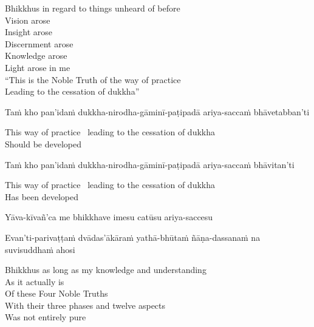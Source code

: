 \begin{english-verses}
  Bhikkhus in regard to things unheard of before\\
  Vision arose\\
  Insight arose\\
  Discernment arose\\
  Knowledge arose\\
  Light arose in me\\
  ``This is the Noble Truth of the way of practice\\
  Leading to the cessation of dukkha''
\end{english-verses}

\begin{pali-hang}
  Taṁ kho pan'idaṁ dukkha-nirodha-gāminī-paṭipadā ariya-saccaṁ bhāvetabban'ti
\end{pali-hang}

\begin{english}
  This way of practice \breathmark\ leading to the cessation of dukkha\\
  Should be developed
\end{english}

\begin{pali-hang}
  Taṁ kho pan'idaṁ dukkha-nirodha-gāminī-paṭipadā ariya-saccaṁ bhāvitan'ti
\end{pali-hang}

\begin{english}
  This way of practice \breathmark\ leading to the cessation of dukkha\\
  Has been developed
\end{english}

Yāva-kīvañ'ca me bhikkhave imesu catūsu ariya-saccesu
\begin{pali-hangtogether}
  Evan'ti-parivaṭṭaṁ dvādas'ākāraṁ yathā-bhūtaṁ ñāṇa-dassanaṁ na suvisuddhaṁ ahosi
\end{pali-hangtogether}

\begin{english-verses}
  Bhikkhus as long as my knowledge and understanding\\
  As it actually is\\
  Of these Four Noble Truths\\
  With their three phases and twelve aspects\makeatletter\hyperlink{endnote57-appendix}\makeatother\\
  Was not entirely pure
\end{english-verses}

